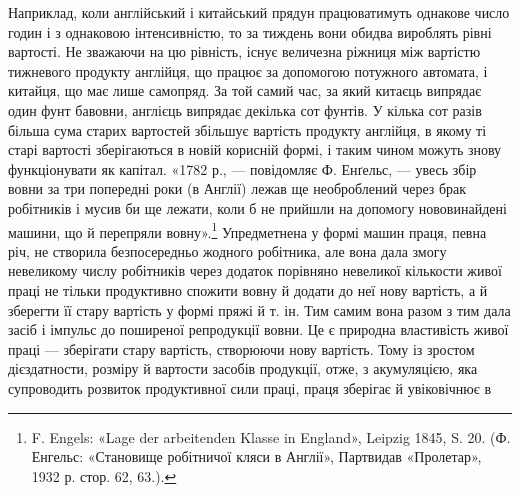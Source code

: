 Наприклад, коли англійський і китайський прядун працюватимуть
однакове число годин і з однаковою інтенсивністю, то за
тиждень вони обидва вироблять рівні вартості. Не зважаючи
на цю рівність, існує величезна ріжниця між вартістю тижневого
продукту англійця, що працює за допомогою потужного
автомата, і китайця, що має лише самопряд. За той самий час,
за який китаєць випрядає один фунт бавовни, англієць випрядає
декілька сот фунтів. У кілька сот разів більша сума старих вартостей
збільшує вартість продукту англійця, в якому ті старі
вартості зберігаються в новій корисній формі, і таким чином
можуть знову функціонувати як капітал. «1782 р., — повідомляє
Ф. Енґельс, — увесь збір вовни за три попередні роки (в Англії)
лежав ще необроблений через брак робітників і мусив би ще лежати,
коли б не прийшли на допомогу нововинайдені машини, що
й перепряли вовну».\footnote{
F. Engels: «Lage der arbeitenden Klasse in England», Leipzig
1845, S. 20. (Ф. Енгельс: «Становище робітничої кляси в Англії», Партвидав
«Пролетар», 1932 р. стор. 62, 63.).
} Упредметнена у формі машин праця,
певна річ, не створила безпосередньо жодного робітника, але
вона дала змогу невеликому числу робітників через додаток
порівняно невеликої кількости живої праці не тільки продуктивно
спожити вовну й додати до неї нову вартість, а й зберегти її стару
вартість у формі пряжі й т. ін. Тим самим вона разом з тим дала
засіб і імпульс до поширеної репродукції вовни. Це є природна
властивість живої праці — зберігати стару вартість, створюючи
нову вартість. Тому із зростом дієздатности, розміру й вартости
засобів продукції, отже, з акумуляцією, яка супроводить розвиток
продуктивної сили праці, праця зберігає й увіковічнює в
